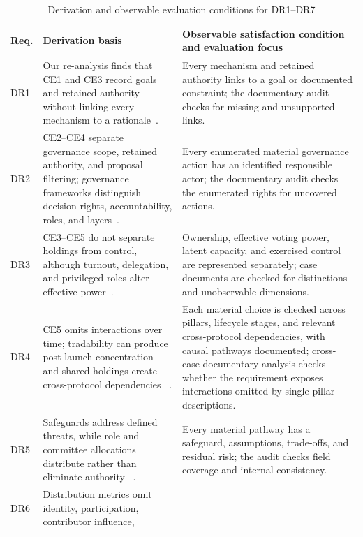 \documentclass[referee,sn-basic]{sn-jnl}
\begin{document}
\begin{table}[!t]
\caption{Derivation and observable evaluation conditions for DR1--DR7}
\label{tab:requirement-derivation}
\centering
\footnotesize
\begin{tabularx}{\linewidth}{@{}p{.07\linewidth}p{.39\linewidth}X@{}}
\toprule
Req. & Derivation basis & Observable satisfaction condition and evaluation focus \\
\midrule
DR1 & Our re-analysis finds that CE1 and CE3 record goals and retained authority
without linking every mechanism to a rationale~\citep{Kivilo2023TokenEconomy}.
& Every mechanism and retained authority links to a goal or documented
constraint; the documentary audit checks for missing and unsupported links. \\
DR2 & CE2--CE4 separate governance scope, retained authority, and proposal
filtering; governance frameworks distinguish decision rights, accountability,
roles, and layers~\citep{Kivilo2023TokenEconomy,vanPelt2021,
Jungnickel2026ModularDAO}. & Every enumerated material governance action has an identified
responsible actor; the documentary audit checks the enumerated rights for
uncovered actions. \\
DR3 & CE3--CE5 do not separate holdings from control, although turnout,
delegation, and privileged roles alter effective power~\citep{Fritsch2024VotingPower,
Eisermann2025Concentration,Han2026DAOGovernance}. & Ownership, effective voting
power, latent capacity, and exercised control are represented separately; case
documents are checked for distinctions and unobservable dimensions. \\
DR4 & CE5 omits interactions over time; tradability can produce post-launch
concentration and shared holdings create cross-protocol dependencies
~\citep{DelgadoFernandez2024FairLaunch,
Eisermann2025Concentration}. & Each material choice is checked across pillars,
lifecycle stages, and relevant cross-protocol dependencies, with causal
pathways documented; cross-case documentary analysis checks whether the
requirement exposes interactions omitted by single-pillar descriptions. \\
DR5 & Safeguards address defined threats, while role and committee allocations
distribute rather than eliminate authority
~\citep{Tamai2024WhaleCollusion,Jungnickel2026ModularDAO}. & Every material
pathway has a safeguard, assumptions, trade-offs, and residual risk; the audit
checks field coverage and internal consistency. \\
DR6 & Distribution metrics omit identity, participation, contributor influence,

\end{tabularx}
\end{table}
\end{document}
